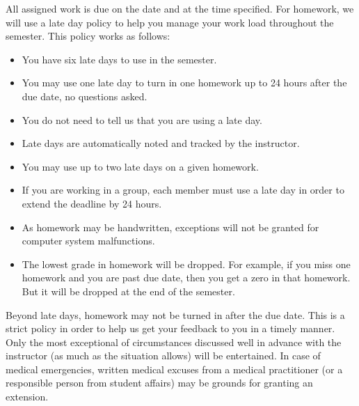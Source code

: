 \documentclass[twoside]{article}
\begin{document}
All assigned work is due on the date and at the time specified. For homework, we will use a late day policy to help you manage your work load throughout the semester. This policy works as follows:
\begin{itemize}
\item You have six late days to use in the semester.
\item You may use one late day to turn in one homework up to 24 hours after the due date, no questions asked.
\item You do not need to tell us that you are using a late day.
\item Late days are automatically noted and tracked by the instructor.
\item You may use up to two late days on a given homework.
\item If you are working in a group, each member must use a late day in order to extend the deadline by 24 hours.
\item As homework may be handwritten, exceptions will not be granted for computer system malfunctions.
\item The lowest grade in homework will be dropped. For example, if you miss one homework and you are past due date, then you get a zero in that homework. But it will be dropped at the end of the semester.
\end{itemize}
Beyond late days, homework may not be turned in after the due date. This is a strict policy in order to help us get
your feedback to you in a timely manner. Only the most exceptional of circumstances discussed well in advance
with the instructor (as much as the situation allows) will be entertained. In case of medical emergencies, written
medical excuses from a medical practitioner (or a responsible person from student affairs) may be grounds for granting an extension. %
\end{document}
